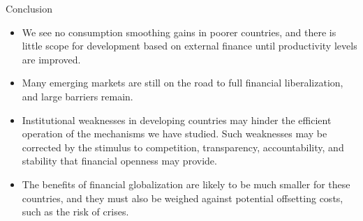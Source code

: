 \documentclass[
  ignorenonframetext,
]{beamer}
\begin{document}
\begin{frame}{Conclusion}
\label{conclusion-2}
\begin{itemize}
\item
  We see no consumption smoothing gains in poorer countries, and there
  is little scope for development based on external finance until
  productivity levels are improved.
\item
  Many emerging markets are still on the road to full financial
  liberalization, and large barriers remain.
\item
  Institutional weaknesses in developing countries may hinder the
  efficient operation of the mechanisms we have studied. Such weaknesses
  may be corrected by the stimulus to competition, transparency,
  accountability, and stability that financial openness may provide.
\item
  The benefits of financial globalization are likely to be much smaller
  for these countries, and they must also be weighed against potential
  offsetting costs, such as the risk of crises.
\end{itemize}
\end{frame}
\end{document}
